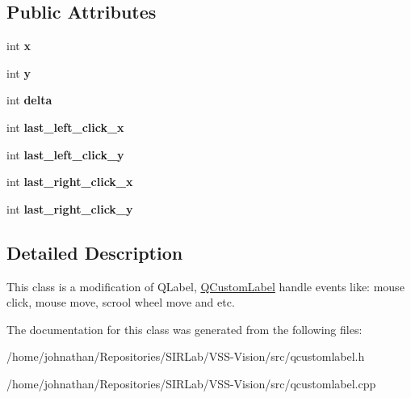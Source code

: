 \subsection*{Public Attributes}
\begin{DoxyCompactItemize}
\item 
int {\bfseries x}\hypertarget{classQCustomLabel_a509c6eb2bc4e80ad72901c1afc976b92}{}\label{classQCustomLabel_a509c6eb2bc4e80ad72901c1afc976b92}

\item 
int {\bfseries y}\hypertarget{classQCustomLabel_a3d3309c76e47ccba7101e5504091804c}{}\label{classQCustomLabel_a3d3309c76e47ccba7101e5504091804c}

\item 
int {\bfseries delta}\hypertarget{classQCustomLabel_a64b5c030bb65139b76f063de1d0784bf}{}\label{classQCustomLabel_a64b5c030bb65139b76f063de1d0784bf}

\item 
int {\bfseries last\+\_\+left\+\_\+click\+\_\+x}\hypertarget{classQCustomLabel_a5fa4f875b266bd86a552867e60be86da}{}\label{classQCustomLabel_a5fa4f875b266bd86a552867e60be86da}

\item 
int {\bfseries last\+\_\+left\+\_\+click\+\_\+y}\hypertarget{classQCustomLabel_abb541cfa1a5ceb23f29bc08573838bcd}{}\label{classQCustomLabel_abb541cfa1a5ceb23f29bc08573838bcd}

\item 
int {\bfseries last\+\_\+right\+\_\+click\+\_\+x}\hypertarget{classQCustomLabel_a7b13426cb8aedd2d0af1d55502d61325}{}\label{classQCustomLabel_a7b13426cb8aedd2d0af1d55502d61325}

\item 
int {\bfseries last\+\_\+right\+\_\+click\+\_\+y}\hypertarget{classQCustomLabel_a85b2496bc41541923c82ef03894885a7}{}\label{classQCustomLabel_a85b2496bc41541923c82ef03894885a7}

\end{DoxyCompactItemize}


\subsection{Detailed Description}
This class is a modification of Q\+Label, \hyperlink{classQCustomLabel}{Q\+Custom\+Label} handle events like\+: mouse click, mouse move, scrool wheel move and etc. 

The documentation for this class was generated from the following files\+:\begin{DoxyCompactItemize}
\item 
/home/johnathan/\+Repositories/\+S\+I\+R\+Lab/\+V\+S\+S-\/\+Vision/src/qcustomlabel.\+h\item 
/home/johnathan/\+Repositories/\+S\+I\+R\+Lab/\+V\+S\+S-\/\+Vision/src/qcustomlabel.\+cpp\end{DoxyCompactItemize}

